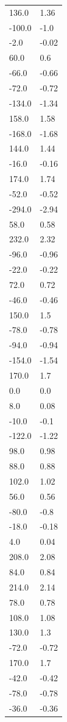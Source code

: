 \begin{longtable}{ll}
136.0 & 1.36 \\
-100.0 & -1.0 \\
-2.0 & -0.02 \\
60.0 & 0.6 \\
-66.0 & -0.66 \\
-72.0 & -0.72 \\
-134.0 & -1.34 \\
158.0 & 1.58 \\
-168.0 & -1.68 \\
144.0 & 1.44 \\
-16.0 & -0.16 \\
174.0 & 1.74 \\
-52.0 & -0.52 \\
-294.0 & -2.94 \\
58.0 & 0.58 \\
232.0 & 2.32 \\
-96.0 & -0.96 \\
-22.0 & -0.22 \\
72.0 & 0.72 \\
-46.0 & -0.46 \\
150.0 & 1.5 \\
-78.0 & -0.78 \\
-94.0 & -0.94 \\
-154.0 & -1.54 \\
170.0 & 1.7 \\
0.0 & 0.0 \\
8.0 & 0.08 \\
-10.0 & -0.1 \\
-122.0 & -1.22 \\
98.0 & 0.98 \\
88.0 & 0.88 \\
102.0 & 1.02 \\
56.0 & 0.56 \\
-80.0 & -0.8 \\
-18.0 & -0.18 \\
4.0 & 0.04 \\
208.0 & 2.08 \\
84.0 & 0.84 \\
214.0 & 2.14 \\
78.0 & 0.78 \\
108.0 & 1.08 \\
130.0 & 1.3 \\
-72.0 & -0.72 \\
170.0 & 1.7 \\
-42.0 & -0.42 \\
-78.0 & -0.78 \\
-36.0 & -0.36 \\

\end{longtable}

